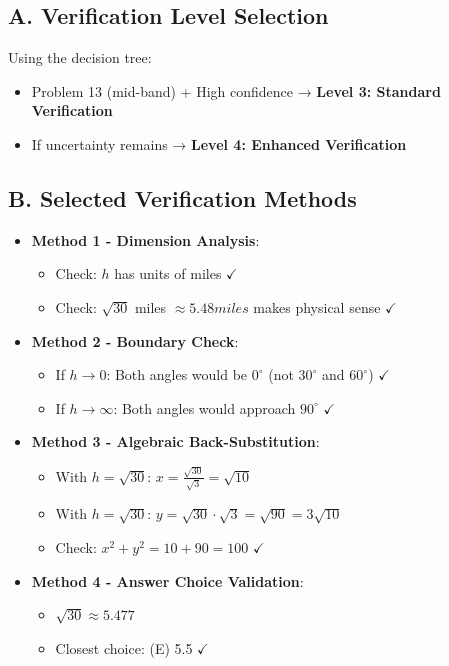 \documentclass[12pt]{article}
\begin{document}
\begin{verificationbox}
\subsection*{A. Verification Level Selection}
Using the decision tree:
\begin{itemize}[leftmargin=*]
    \item Problem 13 (mid-band) + High confidence → \textbf{Level 3: Standard Verification}
    \item If uncertainty remains → \textbf{Level 4: Enhanced Verification}
\end{itemize}

\subsection*{B. Selected Verification Methods}
\begin{itemize}[leftmargin=*]
    \item \textbf{Method 1 - Dimension Analysis}: 
    \begin{itemize}
        \item Check: $h$ has units of miles $\checkmark$
        \item Check: $\sqrt{30}$ miles $\approx 5.48 miles$ makes physical sense $\checkmark$
    \end{itemize}
    \item \textbf{Method 2 - Boundary Check}:
    \begin{itemize}
        \item If $h \to 0$: Both angles would be $0^\circ$ (not $30^\circ$ and $60^\circ$) $\checkmark$
        \item If $h \to \infty$: Both angles would approach $90^\circ$ $\checkmark$
    \end{itemize}
    \item \textbf{Method 3 - Algebraic Back-Substitution}:
    \begin{itemize}
        \item With $h = \sqrt{30}$: $x = \frac{\sqrt{30}}{\sqrt{3}} = \sqrt{10}$
        \item With $h = \sqrt{30}$: $y = \sqrt{30} \cdot \sqrt{3} = \sqrt{90} = 3\sqrt{10}$
        \item Check: $x^2 + y^2 = 10 + 90 = 100$ $\checkmark$
    \end{itemize}
    \item \textbf{Method 4 - Answer Choice Validation}:
    \begin{itemize}
        \item $\sqrt{30} \approx 5.477$
        \item Closest choice: (E) 5.5 $\checkmark$
    \end{itemize}
\end{itemize}


\end{verificationbox}
\end{document}
